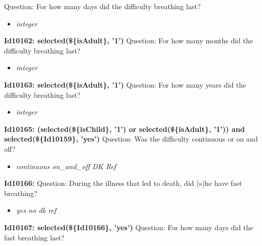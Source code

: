 \documentclass{article}%
\begin{document}
Question: For how many days did the difficulty breathing last?\newline%
%
\begin{itemize}%
\item%
\textit{integer\newline%
}%
\end{itemize}%
\textbf{Id10162: selected(\$\{isAdult\}, '1')\newline%
}%
Question: For how many months did the difficulty breathing last?\newline%
%
\begin{itemize}%
\item%
\textit{integer\newline%
}%
\end{itemize}%
\textbf{Id10163: selected(\$\{isAdult\}, '1')\newline%
}%
Question: For how many years did the difficulty breathing last?\newline%
%
\begin{itemize}%
\item%
\textit{integer\newline%
}%
\end{itemize}%
\textbf{Id10165: (selected(\$\{isChild\}, '1') or selected(\$\{isAdult\}, '1')) and selected(\$\{Id10159\}, 'yes')\newline%
}%
Question: Was the difficulty continuous or on and off?\newline%
%
\begin{itemize}%
\item%
\textit{continuous\newline%
 on\_and\_off\newline%
 DK\newline%
 Ref\newline%
}%
\end{itemize}%
\textbf{Id10166: \newline%
}%
Question: During the illness that led to death, did (s)he have fast breathing?\newline%
%
\begin{itemize}%
\item%
\textit{yes\newline%
 no\newline%
 dk\newline%
 ref\newline%
}%
\end{itemize}%
\textbf{Id10167: selected(\$\{Id10166\}, 'yes')\newline%
}%
Question: For how many days did the fast breathing last?\newline%
\end{document}
